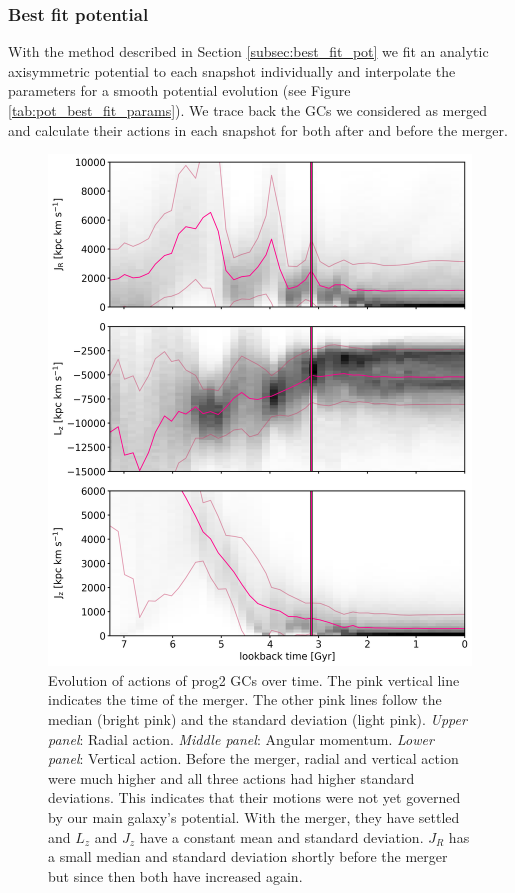 \subsubsection{Best fit potential}\label{subsubsec:GCs_action_time_right_pot}
With the method described in Section \ref{subsec:best_fit_pot} we fit an analytic axisymmetric potential to each snapshot individually and interpolate the parameters for a smooth potential evolution (see Figure \ref{tab:pot_best_fit_params}). We trace back the \acp{GC} we considered as merged and calculate their actions in each snapshot for both after and before the merger. 
\begin{figure}[htbp]
\captionsetup{format=plain}
    \centering
	\includegraphics[width=\textwidth]{plots/Dynamics/prog2/action_time_evolution_wodisk_hist_mean.png}

	\caption{Evolution of actions of prog2 \acp{GC} over time. The pink vertical line indicates the time of the merger. The other pink lines follow the median (bright pink) and the standard deviation (light pink). \textit{Upper panel}: Radial action. \textit{Middle panel}: Angular momentum. \textit{Lower panel}: Vertical action. Before the merger, radial and vertical action were much higher and all three actions had higher standard deviations. This indicates that their motions were not yet governed by our main galaxy's potential. With the merger, they have settled and $L_z$ and $J_z$ have a constant mean and standard deviation. $J_R$ has a small median and standard deviation shortly before the merger but since then both have increased again.}\label{fig:actions_time_evolution_prog2}
\end{figure}

